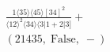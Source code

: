 \documentclass[varwidth, border=5pt]{standalone}
\begin{document}
\begin{my}
$\begin{gathered}
\scriptscriptstyle\frac{1⟨35⟩⟨45⟩[34]^2}{⟨12⟩^2⟨34⟩⟨3|1+2|3]}+\\
\scriptscriptstyle(21435,\;\text{False},\;-)\phantom{+}
\end{gathered}$
\end{my}
\end{document}
